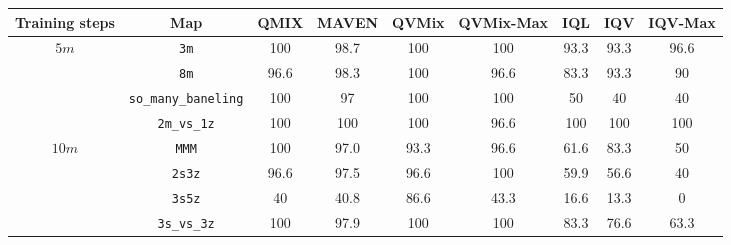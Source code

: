 \begin{tabular}{|c|c|c|c|c|c||c|c|c|}
        \hline
        
        Training steps & Map & QMIX & MAVEN &     QVMix & QVMix-Max  & IQL & IQV & IQV-Max\\
        \hline
        \multirow{4}{*}{$5m$}  & \texttt{3m} & \cellcolor{yellow!25}100 & 98.7 &   \cellcolor{green!25}100 & 100 & 93.3 & 93.3& 96.6 \\
        
        & \texttt{8m} & 96.6& \cellcolor{yellow!25}98.3 &  \cellcolor{green!25}100 & 96.6 & 83.3& 93.3& 90\\
        
        & \texttt{so\_many\_baneling} & \cellcolor{yellow!25}100 & 97  & \cellcolor{green!25}100& 100& 50 & 40 & 40\\
        
        & \texttt{2m\_vs\_1z} & \cellcolor{yellow!25}100 & 100 &\cellcolor{green!25}100 & 96.6  & 100 & 100 & 100\\
        \hline
        
       \multirow{4}{*}{$10m$} &\texttt{MMM} & \cellcolor{green!25}100 & \cellcolor{yellow!25}97.0 & 93.3 & 96.6  & 61.6 & 83.3 & 50 \\
        
          &\texttt{2s3z}  & 96.6 & \cellcolor{yellow!25}97.5 &  96.6 & \cellcolor{green!25}100 & 59.9 & 56.6 & 40 \\
        
         &\texttt{3s5z} & 40 & 40.8 &\cellcolor{green!25}86.6 & \cellcolor{yellow!25}43.3  & 16.6 & 13.3 & 0 \\
        
         &\texttt{3s\_vs\_3z}  & \cellcolor{yellow!25}100 & 97.9  &  \cellcolor{green!25}100 & 100  & 83.3 & 76.6 & 63.3 \\
        \hline
    \end{tabular}
    
        
